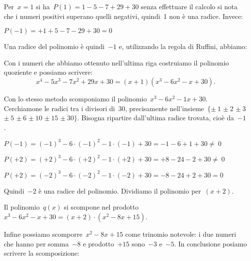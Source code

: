 \begin{exrig}
\begin{multicols}{2}
 
Per~$x=1$ si ha~$P(1)=1-5-7+29+30$ senza effettuare il calcolo si nota che i 
numeri positivi superano quelli negativi, quindi~1 non è una radice. 
Invece:

$P(-1)=+1+5-7-29+30=0$


Una radice del polinomio è quindi~$-1$ e, utilizzando la regola di Ruffini,
abbiamo:
\begin{center}
 
\end{center}

\end{multicols}

Con i numeri che abbiamo ottenuto nell'ultima riga costruiamo il polinomio 
quoziente e possiamo scrivere:
\[x^{4}-5x^{3}-7x^{2}+29x+30=(x+1)(x^{3}-6x^{2}-x+30).\]

Con lo stesso metodo scomponiamo il polinomio~$x^{3}-6x^{2}-1x+30$.
Cerchiamone le radici tra i divisori di~30, precisamente
nell'insieme~$\{\pm~1$ $\pm~2$ $\pm~3$ $\pm~5$ $\pm~6$ $\pm~10$
$\pm~15$ $\pm~30\}$. Bisogna ripartire dall'ultima
radice trovata, cioè da~$-1$.

$P(-1)=(-1)^{3}-6\cdot (-1)^{2}-1\cdot (-1)+30=-1-6+1+30\neq~0$

$P(+2)=(+2)^{3}-6\cdot (+2)^{2}-1\cdot (+2)+30=+8-24-2+30\neq~0$

$P(+2)=(-2)^{3}-6\cdot (-2)^{2}-1\cdot (-2)+30=-8-24+2+30=0$

\begin{multicols}{2}
 
Quindi~$-2$ è una radice del polinomio. Dividiamo il polinomio per~$(x+2)$.
\begin{center}
 
\end{center}

\end{multicols}

Il polinomio~$q(x)$ si scompone nel
prodotto~$x^{3}-6x^{2}-x+30=(x+2)\cdot (x^{2}-8x+15)$.

Infine possiamo scomporre~$x^{2}-8x+15$ come trinomio notevole: i due
numeri che hanno per somma~$-8$ e prodotto~$+15$ sono~$-3$ e~$-5$. In
conclusione posiamo scrivere la scomposizione:


\end{exrig}
